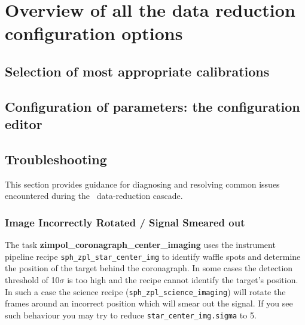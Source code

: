 \section{Overview of all the data reduction configuration options}
\label{sec:configuration_overview}

\subsection{Selection of most appropriate calibrations}



\subsection{Configuration of parameters: the configuration editor}
\label{sec:configuration_editor}


\subsection{Troubleshooting}

This section provides guidance for diagnosing and resolving common issues encountered during the \instname\ data-reduction cascade.


\subsubsection{Image Incorrectly Rotated / Signal Smeared out}

The task \textbf{zimpol\_coronagraph\_center\_imaging} uses the instrument pipeline recipe \texttt{sph\_zpl\_star\_center\_img}
to identify waffle spots and determine the position of the target behind the coronagraph.
In some cases the detection threshold of 10$\sigma$ is too high and the recipe cannot identify
the target’s position. In such a case the science recipe (\texttt{sph\_zpl\_science\_imaging})
will rotate the frames around an incorrect position which will smear out the signal.
If you see such behaviour you may try to reduce \texttt{star\_center\_img.sigma} to 5.
